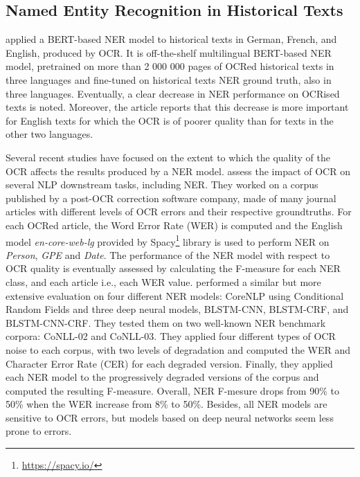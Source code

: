 \subsection{Named Entity Recognition in Historical Texts}

\cite{Labusch2020NamedED} applied a BERT-based NER model to historical texts in German, French, and English, produced by OCR. It is off-the-shelf multilingual BERT-based NER model, pretrained on more than 2 000 000 pages of OCRed historical texts in three languages and fine-tuned on historical texts NER ground truth, also in three languages. Eventually, a clear decrease in NER performance on OCRised texts is noted. Moreover, the article reports that this decrease is more important for English texts for which the OCR is of poorer quality than for texts in the other two languages. 

Several recent studies have focused on the extent to which the quality of the OCR affects the results produced by a NER model.\cite{van2020assessing} assess the impact of OCR on several NLP downstream tasks, including NER. They worked on a corpus published by a post-OCR correction software company, made of many journal articles with different levels of OCR errors and their respective groundtruths. For each OCRed article, the Word Error Rate (WER) is computed and the English model \textit{en-core-web-lg} provided by Spacy\footnote{\url{https://spacy.io/}} library is used to perform NER on \textit{Person}, \textit{GPE} and \textit{Date}. The performance of the NER model with respect to OCR quality is eventually assessed by calculating the F-measure for each NER class, and each article i.e., each WER value. \cite{hamdi2020assessing} performed a similar but more extensive evaluation on four different NER models: CoreNLP using Conditional Random Fields and three deep neural models, BLSTM-CNN, BLSTM-CRF, and BLSTM-CNN-CRF. They tested them on two well-known NER benchmark corpora: CoNLL-02 and CoNLL-03. They applied four different types of OCR noise to each corpus, with two levels of degradation and computed the WER and Character Error Rate (CER) for each degraded version. Finally, they applied each NER model to the progressively degraded versions of the corpus and computed the resulting F-measure. Overall, NER F-mesure drops from 90\% to 50\% when the WER increase from 8\% to 50\%. Besides, all NER models are sensitive to OCR errors, but models based on deep neural networks seem less prone to errors.

